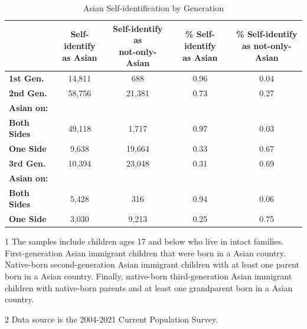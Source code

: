 \begin{table}[H]
\centering\centering
\caption{Asian Self-identification by Generation \label{tab:asianbygen}}
\centering
\begin{threeparttable}
\begin{tabular}[t]{>{}lcccc}
\toprule
  & \specialcell{Self-identify \\ as Asian} & \specialcell{Self-identify as \\ not-only-Asian} & \specialcell{\% Self-identify \\ as Asian} & \specialcell{\% Self-identify \\ as not-only-Asian}\\
\midrule
\textbf{1st Gen.} & 14,811 & 688 & 0.96 & 0.04\\
\textbf{2nd Gen.} & 58,756 & 21,381 & 0.73 & 0.27\\
\hspace{1em}\textbf{Asian on:} &  &  &  \vphantom{1} & \\
\hspace{1em}\hspace{1em}\textbf{Both Sides} & 49,118 & 1,717 & 0.97 & 0.03\\
\hspace{1em}\hspace{1em}\textbf{One Side} & 9,638 & 19,664 & 0.33 & 0.67\\
\addlinespace
\textbf{3rd Gen.} & 10,394 & 23,048 & 0.31 & 0.69\\
\hspace{1em}\textbf{Asian on:} &  &  &  & \\
\hspace{1em}\hspace{1em}\textbf{Both Sides} & 5,428 & 316 & 0.94 & 0.06\\
\hspace{1em}\hspace{1em}\textbf{One Side} & 3,030 & 9,213 & 0.25 & 0.75\\
\bottomrule
\end{tabular}
\begin{tablenotes}
\item[1] The samples include children ages 17 and below who live in intact families. First-generation Asian immigrant children that were born in a Asian country. Native-born second-generation Asian immigrant children with at least one parent born in a Asian country. Finally, native-born third-generation Asian immigrant children with native-born parents and at least one grandparent born in a Asian country.
\item[2] Data source is the 2004-2021 Current Population Survey.
\end{tablenotes}
\end{threeparttable}
\end{table}
